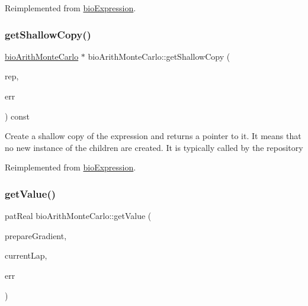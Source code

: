 Reimplemented from \hyperlink{classbio_expression_a2353a4afb3a2b0af7c63aba086a72bde}{bio\+Expression}.

\mbox{\label{classbio_arith_monte_carlo_ad91e62a31bbad6cb336f078747fbc7ae}} 
\subsubsection{\texorpdfstring{get\+Shallow\+Copy()}{getShallowCopy()}}
{\footnotesize\ttfamily \hyperlink{classbio_arith_monte_carlo}{bio\+Arith\+Monte\+Carlo} $\ast$ bio\+Arith\+Monte\+Carlo\+::get\+Shallow\+Copy (\begin{DoxyParamCaption}\item[{\hyperlink{classbio_expression_repository}{bio\+Expression\+Repository} $\ast$}]{rep,  }\item[{pat\+Error $\ast$\&}]{err }\end{DoxyParamCaption}) const\hspace{0.3cm}{\ttfamily [virtual]}}

Create a shallow copy of the expression and returns a pointer to it. It means that no new instance of the children are created. It is typically called by the repository 

Reimplemented from \hyperlink{classbio_expression_a442534762693b92baaf33928979a1bf8}{bio\+Expression}.

\mbox{\label{classbio_arith_monte_carlo_a0c1b08214fb40a9b77411c003bd022c5}} 
\subsubsection{\texorpdfstring{get\+Value()}{getValue()}}
{\footnotesize\ttfamily pat\+Real bio\+Arith\+Monte\+Carlo\+::get\+Value (\begin{DoxyParamCaption}\item[{pat\+Boolean}]{prepare\+Gradient,  }\item[{pat\+U\+Long}]{current\+Lap,  }\item[{pat\+Error $\ast$\&}]{err }\end{DoxyParamCaption})\hspace{0.3cm}{\ttfamily [virtual]}}

